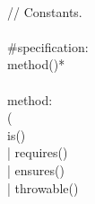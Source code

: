 \begin{bigbigpre}
 \\
// Constants. \\
 \\
#specification: \\
    method()* \\
 \\
method: \\
    ( \\
        is() \\
      | requires() \\
      | ensures() \\
      | throwable() \\

\end{bigbigpre}
